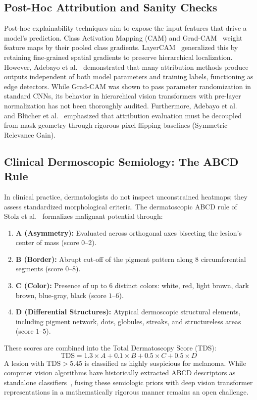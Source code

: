 \documentclass[11pt,a4paper]{article}
\begin{document}
\subsection{Post-Hoc Attribution and Sanity Checks}
Post-hoc explainability techniques aim to expose the input features that drive a model's prediction. Class Activation Mapping (CAM) and Grad-CAM~\cite{selvaraju2017gradcam} weight feature maps by their pooled class gradients. LayerCAM~\cite{jiang2021layercam} generalized this by retaining fine-grained spatial gradients to preserve hierarchical localization. However, Adebayo et al.~\cite{adebayo2018sanity} demonstrated that many attribution methods produce outputs independent of both model parameters and training labels, functioning as edge detectors. While Grad-CAM was shown to pass parameter randomization in standard CNNs, its behavior in hierarchical vision transformers with pre-layer normalization has not been thoroughly audited. Furthermore, Adebayo et al.~\cite{adebayo2022post} and Bl{\"u}cher et al.~\cite{blucher2024decoupling} emphasized that attribution evaluation must be decoupled from mask geometry through rigorous pixel-flipping baselines (Symmetric Relevance Gain).

\subsection{Clinical Dermoscopic Semiology: The ABCD Rule}
In clinical practice, dermatologists do not inspect unconstrained heatmaps; they assess standardized morphological criteria. The dermatoscopic ABCD rule of Stolz et al.~\cite{stolz1994abcd} formalizes malignant potential through:
\begin{enumerate}
    \item \textbf{A (Asymmetry):} Evaluated across orthogonal axes bisecting the lesion's center of mass (score $0\text{--}2$).
    \item \textbf{B (Border):} Abrupt cut-off of the pigment pattern along 8 circumferential segments (score $0\text{--}8$).
    \item \textbf{C (Color):} Presence of up to 6 distinct colors: white, red, light brown, dark brown, blue-gray, black (score $1\text{--}6$).
    \item \textbf{D (Differential Structures):} Atypical dermoscopic structural elements, including pigment network, dots, globules, streaks, and structureless areas (score $1\text{--}5$).
\end{enumerate}
These scores are combined into the Total Dermatoscopy Score (TDS):
\begin{equation}
\label{eq:tds}
\text{TDS} = 1.3 \times A + 0.1 \times B + 0.5 \times C + 0.5 \times D
\end{equation}
A lesion with $\text{TDS} > 5.45$ is classified as highly suspicious for melanoma. While computer vision algorithms have historically extracted ABCD descriptors as standalone classifiers~\cite{celebi2007methodological, barata2013two}, fusing these semiologic priors with deep vision transformer representations in a mathematically rigorous manner remains an open challenge.
\end{document}
